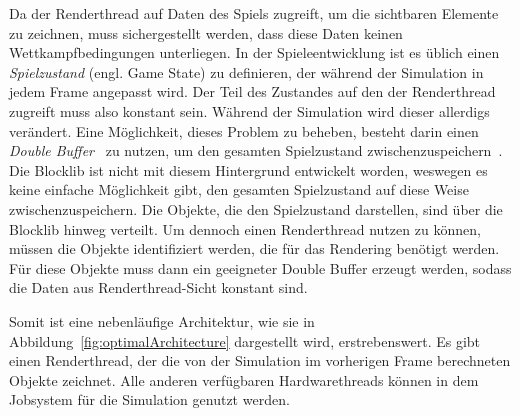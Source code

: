 Da der Renderthread auf Daten des Spiels zugreift, um die sichtbaren Elemente zu zeichnen, muss sichergestellt werden, dass diese Daten keinen Wettkampfbedingungen unterliegen. In der Spieleentwicklung ist es üblich einen \emph{Spielzustand} (engl. Game State) zu definieren, der während der Simulation in jedem Frame angepasst wird. Der Teil des Zustandes auf den der Renderthread zugreift muss also konstant sein. Während der Simulation wird dieser allerdigs verändert. Eine Möglichkeit, dieses Problem zu beheben, besteht darin einen \emph{Double Buffer}~\cite[S.~143]{Nystrom2015} zu nutzen, um den gesamten Spielzustand zwischenzuspeichern~\cite{Tatarchuk2014}. Die Blocklib ist nicht mit diesem Hintergrund entwickelt worden, weswegen es keine einfache Möglichkeit gibt, den gesamten Spielzustand auf diese Weise zwischenzuspeichern. Die Objekte, die den Spielzustand darstellen, sind über die Blocklib hinweg verteilt. Um dennoch einen Renderthread nutzen zu können, müssen die Objekte identifiziert werden, die für das Rendering benötigt werden. Für diese Objekte muss dann ein geeigneter Double Buffer erzeugt werden, sodass die Daten aus Renderthread-Sicht konstant sind.

Somit ist eine nebenläufige Architektur, wie sie in Abbildung~\ref{fig:optimalArchitecture} dargestellt wird, erstrebenswert. Es gibt einen Renderthread, der die von der Simulation im vorherigen Frame berechneten Objekte zeichnet. Alle anderen verfügbaren Hardwarethreads können in dem Jobsystem für die Simulation genutzt werden. 


